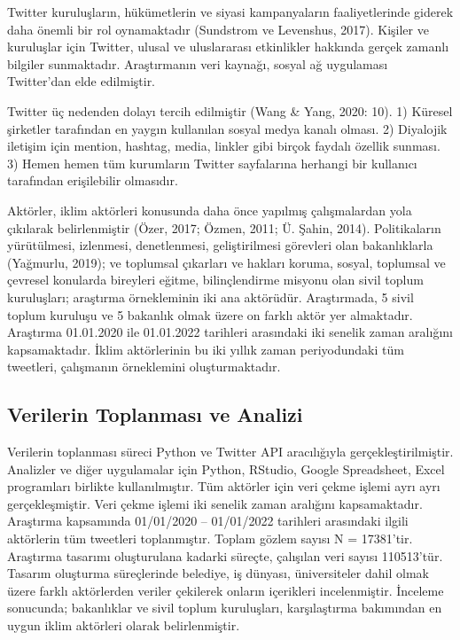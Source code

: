 \documentclass[
]{book}
\begin{document}
Twitter kuruluşların, hükümetlerin ve siyasi kampanyaların faaliyetlerinde giderek daha önemli bir rol oynamaktadır (Sundstrom ve Levenshus, 2017). Kişiler ve kuruluşlar için Twitter, ulusal ve uluslararası etkinlikler hakkında gerçek zamanlı bilgiler sunmaktadır. Araştırmanın veri kaynağı, sosyal ağ uygulaması Twitter'dan elde edilmiştir.

Twitter üç nedenden dolayı tercih edilmiştir (Wang \& Yang, 2020: 10).
1) Küresel şirketler tarafından en yaygın kullanılan sosyal medya kanalı olması.
2) Diyalojik iletişim için mention, hashtag, media, linkler gibi birçok faydalı özellik sunması.
3) Hemen hemen tüm kurumların Twitter sayfalarına herhangi bir kullanıcı tarafından erişilebilir olmasıdır.

Aktörler, iklim aktörleri konusunda daha önce yapılmış çalışmalardan yola çıkılarak belirlenmiştir (Özer, 2017; Özmen, 2011; Ü. Şahin, 2014). Politikaların yürütülmesi, izlenmesi, denetlenmesi, geliştirilmesi görevleri olan bakanlıklarla (Yağmurlu, 2019); ve toplumsal çıkarları ve hakları koruma, sosyal, toplumsal ve çevresel konularda bireyleri eğitme, bilinçlendirme misyonu olan sivil toplum kuruluşları; araştırma örnekleminin iki ana aktörüdür. Araştırmada, 5 sivil toplum kuruluşu ve 5 bakanlık olmak üzere on farklı aktör yer almaktadır. Araştırma 01.01.2020 ile 01.01.2022 tarihleri arasındaki iki senelik zaman aralığını kapsamaktadır. İklim aktörlerinin bu iki yıllık zaman periyodundaki tüm tweetleri, çalışmanın örneklemini oluşturmaktadır.

\hypertarget{verilerin-toplanmasux131-ve-analizi}{%
\subsection{Verilerin Toplanması ve Analizi}\label{verilerin-toplanmasux131-ve-analizi}}

Verilerin toplanması süreci Python ve Twitter API aracılığıyla gerçekleştirilmiştir. Analizler ve diğer uygulamalar için Python, RStudio, Google Spreadsheet, Excel programları birlikte kullanılmıştır. Tüm aktörler için veri çekme işlemi ayrı ayrı gerçekleşmiştir. Veri çekme işlemi iki senelik zaman aralığını kapsamaktadır. Araştırma kapsamında 01/01/2020 -- 01/01/2022 tarihleri arasındaki ilgili aktörlerin tüm tweetleri toplanmıştır. Toplam gözlem sayısı N = 17381'tir. Araştırma tasarımı oluşturulana kadarki süreçte, çalışılan veri sayısı 110513'tür. Tasarım oluşturma süreçlerinde belediye, iş dünyası, üniversiteler dahil olmak üzere farklı aktörlerden veriler çekilerek onların içerikleri incelenmiştir. İnceleme sonucunda; bakanlıklar ve sivil toplum kuruluşları, karşılaştırma bakımından en uygun iklim aktörleri olarak belirlenmiştir.
\end{document}
